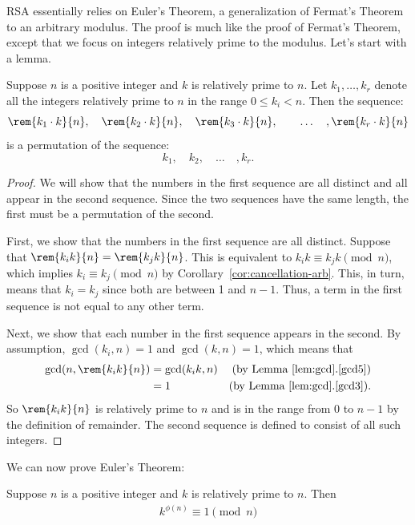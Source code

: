 RSA essentially relies on Euler's Theorem, a generalization of
Fermat's Theorem to an arbitrary modulus.  The proof is much like the
proof of Fermat's Theorem, except that we focus on integers relatively
prime to the modulus.  Let's start with a lemma.

\begin{lemma}
\label{lem:permutes-arb}
Suppose $n$ is a positive integer and $k$ is relatively prime to $n$.
Let $k_1, \dots, k_r$ denote all the integers relatively prime to $n$
in the range $0 \leq k_i < n$.  Then the sequence:
%
\[
\rem{k_1 \cdot k}{n},\quad
\rem{k_2 \cdot k}{n},\quad
\rem{k_3 \cdot k}{n},\quad
\quad \dots\quad,
\rem{k_r \cdot k}{n}
\]
%
is a permutation of the sequence:
%
\[
k_1,\quad k_2,\quad \dots\quad, k_r.
\]
\end{lemma}

\begin{proof}
We will show that the numbers in the first sequence are all distinct
and all appear in the second sequence.  Since the two sequences have
the same length, the first must be a permutation of the second.

First, we show that the numbers in the first sequence are all
distinct.  Suppose that $\rem{k_i k}{n} = \rem{k_j k}{n}$.  This is
equivalent to $k_i k \equiv k_j k \pmod{n}$, which implies $k_i \equiv
k_j \pmod{n}$ by Corollary~\ref{cor:cancellation-arb}.  This, in turn,
means that $k_i = k_j$ since both are between 1 and $n-1$.  Thus, a
term in the first sequence is not equal to any other term.

Next, we show that each number in the first sequence appears in the
second.  By assumption, $\gcd(k_i, n) = 1$ and $\gcd(k, n) = 1$, which
means that
%
\begin{align*}
\gcd(n, \rem{k_i k}{n}) & = \gcd(k_i k, n)
            & \text{(by Lemma~\ref{lem:gcd}.\ref{gcd5})}\\
      & = 1 & \text{(by Lemma~\ref{lem:gcd}.\ref{gcd3})}.
\end{align*}
%
So $\rem{k_i k}{n}$ is relatively prime to $n$ and is in the range from 0
to $n - 1$ by the definition of remainder.  The second sequence is defined
to consist of all such integers.
\end{proof}

We can now prove Euler's Theorem:

\begin{theorem}
Suppose $n$ is a positive integer and $k$ is relatively prime to $n$.
Then
\begin{eqnarray*}
k^{\phi(n)} \equiv 1 \pmod{n}
\end{eqnarray*}
\end{theorem}

